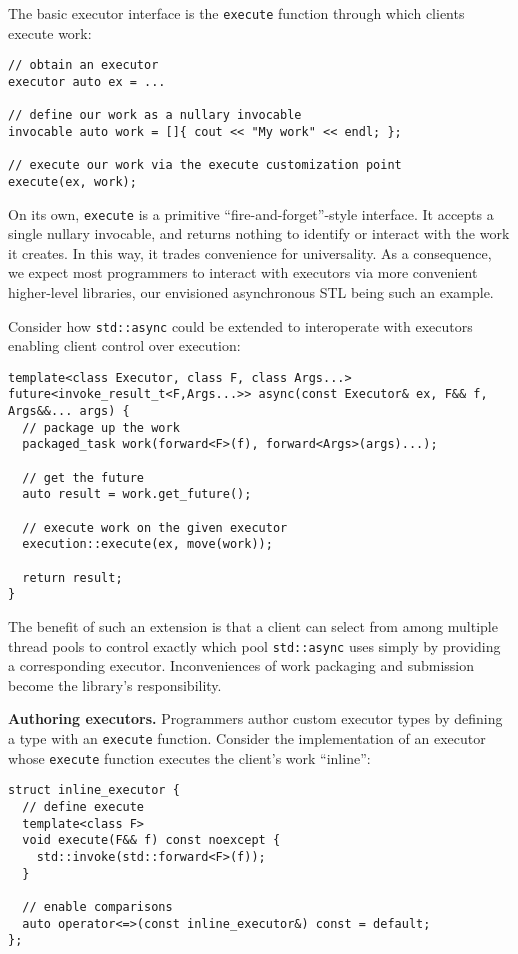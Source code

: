 \documentclass[a4paper,12pt,notitlepage,twoside,openright]{article}
\begin{document}
The basic executor interface is the \texttt{execute}
function through which clients execute work:

\begin{verbatim}
// obtain an executor
executor auto ex = ...

// define our work as a nullary invocable
invocable auto work = []{ cout << "My work" << endl; };

// execute our work via the execute customization point
execute(ex, work);
\end{verbatim}

On its own, \texttt{execute} is a primitive
``fire-and-forget''-style interface. It accepts a single nullary
invocable, and returns nothing to identify or interact with the work it
creates. In this way, it trades convenience for universality. As a
consequence, we expect most programmers to interact with executors via
more convenient higher-level libraries, our envisioned asynchronous STL
being such an example.

Consider how \texttt{std::async} could be extended to
interoperate with executors enabling client control over execution:

\begin{verbatim}
template<class Executor, class F, class Args...>
future<invoke_result_t<F,Args...>> async(const Executor& ex, F&& f, Args&&... args) {
  // package up the work
  packaged_task work(forward<F>(f), forward<Args>(args)...);

  // get the future
  auto result = work.get_future();

  // execute work on the given executor
  execution::execute(ex, move(work));

  return result;
}
\end{verbatim}

The benefit of such an extension is that a client can select from among
multiple thread pools to control exactly which pool
\texttt{std::async} uses simply by providing a corresponding
executor. Inconveniences of work packaging and submission become the
library's responsibility.

\textbf{Authoring executors.} Programmers author custom executor types
by defining a type with an \texttt{execute} function.
Consider the implementation of an executor whose
\texttt{execute} function executes the client's work
``inline'':

\begin{verbatim}
struct inline_executor {
  // define execute
  template<class F>
  void execute(F&& f) const noexcept {
    std::invoke(std::forward<F>(f));
  }

  // enable comparisons
  auto operator<=>(const inline_executor&) const = default;
};
\end{verbatim}
\end{document}
